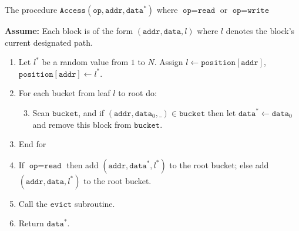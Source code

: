 
\iffalse
\begin{algo}
The procedure
\(\texttt{Access}(\texttt{op},\texttt{addr},\texttt{data}^{*})\)
where \(\texttt{op} = \texttt{read}\) or
\(\texttt{op} = \texttt{write}\)

\textbf{Assume:} Each block is of the form
\(( \texttt{addr},\texttt{data},l )\) where
\(l\) denotes the block's current designated path.

\begin{enumerate}
\item
  Let \(l^{*}\) be a random value from \(1\) to \(N\). Assign
  \(l \leftarrow\texttt{position}\left[ \texttt{addr} \right]\),
  \(\texttt{position}\left[ \texttt{addr} \right] \leftarrow l^{*}\).
\item
  For each bucket from leaf \(l\) to root do:

  \begin{enumerate}
  \setcounter{enumii}{2}
  \item
    Scan \(\texttt{bucket}\), and if
    \(( \texttt{addr},\texttt{data}_{0},\_ ) \in \texttt{bucket}\)
    then let
    \(\texttt{data}^{*} \leftarrow \texttt{data}_{0}\) and
    remove this block from \(\texttt{bucket}\).
  \end{enumerate}
\item
  End for
\item
  If \(\texttt{op} = \texttt{read}\) then add
  \(( \texttt{addr},\texttt{data}^{*},l^{*} )\)
  to the root bucket; else add
  \(( \texttt{addr},\texttt{data},l^{*} )\) to
  the root bucket.
\item
  Call the \(\texttt{evict}\) subroutine.
\item
  Return \(\texttt{data}^{*}\).
\end{enumerate}
\end{algo}

